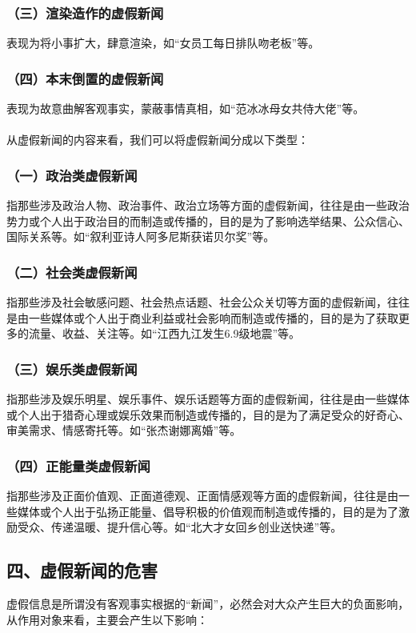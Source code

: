 ﻿\documentclass{ctexart}
\begin{document}
\subsubsection*{\quad \quad （三）渲染造作的虚假新闻}
表现为将小事扩大，肆意渲染，如“女员工每日排队吻老板”等。
\subsubsection*{\quad \quad （四）本末倒置的虚假新闻}
表现为故意曲解客观事实，蒙蔽事情真相，如“范冰冰母女共侍大佬”等。
\\ \hspace*{\fill} \\
\indent
从虚假新闻的内容来看，我们可以将虚假新闻分成以下类型：
\subsubsection*{\quad \quad （一）政治类虚假新闻}
指那些涉及政治人物、政治事件、政治立场等方面的虚假新闻，往往是由一些政治势力或个人出于政治目的而制造或传播的，目的是为了影响选举结果、公众信心、国际关系等。如“叙利亚诗人阿多尼斯获诺贝尔奖”等。
\subsubsection*{\quad \quad （二）社会类虚假新闻}
指那些涉及社会敏感问题、社会热点话题、社会公众关切等方面的虚假新闻，往往是由一些媒体或个人出于商业利益或社会影响而制造或传播的，目的是为了获取更多的流量、收益、关注等。如“江西九江发生6.9级地震”等。
\subsubsection*{\quad \quad （三）娱乐类虚假新闻}
指那些涉及娱乐明星、娱乐事件、娱乐话题等方面的虚假新闻，往往是由一些媒体或个人出于猎奇心理或娱乐效果而制造或传播的，目的是为了满足受众的好奇心、审美需求、情感寄托等。如“张杰谢娜离婚”等。
\subsubsection*{\quad \quad （四）正能量类虚假新闻}
指那些涉及正面价值观、正面道德观、正面情感观等方面的虚假新闻，往往是由一些媒体或个人出于弘扬正能量、倡导积极的价值观而制造或传播的，目的是为了激励受众、传递温暖、提升信心等。如“北大才女回乡创业送快递”等。
\subsection*{\textbf{四、虚假新闻的危害}}
虚假信息是所谓没有客观事实根据的“新闻”，必然会对大众产生巨大的负面影响，从作用对象来看，主要会产生以下影响：
\end{document}
